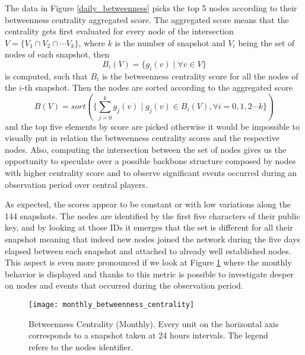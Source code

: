 	The data in Figure \ref{daily_betweenness} picks the top 5 nodes according to their betweenness centrality aggregated score. The aggregated score means that the centrality gets first evaluated for every node of the intersection $V = \{V_1 \cap V_2 \cap \cdots V_k \}$, where $k$ is the number of snapshot and $V_i$ being the set of nodes of each snapshot, then
	\begin{equation}\label{eq:betwenness}
		B_i(V) = \{ g_i(v) \mid \forall v \in V \}
	\end{equation}
	is computed, such that $B_i$ is the betweenness centrality score for all the nodes of the $i$-th snapshot. Then the nodes are sorted according to the aggregated score
	\begin{equation}
		B(V) = sort(\{ \sum_{j = 0}^{k}g_j(v) \mid g_j(v) \in B_i(V), \forall i= 0,1,2 \cdots k\})
	\end{equation}
	and the top five elements by score are picked otherwise it would be impossible to visually put in relation the betweenness centrality scores and the respective nodes. Also, computing the intersection between the set of nodes gives us the opportunity to speculate over a possible backbone structure composed by nodes with higher centrality score and to observe significant events occurred during an observation period over central players.
	
	As expected, the scores appear to be constant or with low variations along the 144 snapshots. The nodes are identified by the first five characters of their public key, and by looking at those IDs it emerges that the set is different for all their snapshot meaning that indeed new nodes joined the network during the five days elapsed between each snapshot and attached to already well established nodes. This aspect is even more pronounced if we look at Figure \ref{monthly_betweenness_centrality} where the monthly behavior is displayed and thanks to this metric is possible to investigate deeper on nodes and events that occurred during the observation period. 
	
	\begin{figure}[ht!]
		\centering
		\texttt{[image: monthly\_betweenness\_centrality]}
		\caption{Betweenness Centrality (Monthly). Every unit on the horizontal axis corresponds to a snapshot taken at 24 hours intervals. The legend refers to the nodes identifier.}
		\label{monthly_betweenness_centrality}
	\end{figure}		
	
